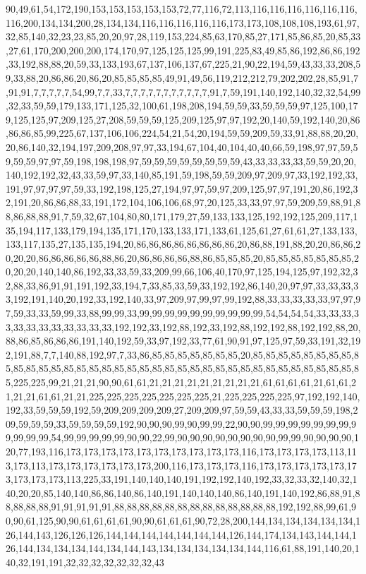 90,49,61,54,172,190,153,153,153,153,153,72,77,116,72,113,116,116,116,116,116,116,116,200,134,134,200,28,134,134,116,116,116,116,116,173,173,108,108,108,193,61,97,32,85,140,32,23,23,85,20,20,97,28,119,153,224,85,63,170,85,27,171,85,86,85,20,85,33,27,61,170,200,200,200,174,170,97,125,125,125,99,191,225,83,49,85,86,192,86,86,192,33,192,88,88,20,59,33,133,193,67,137,106,137,67,225,21,90,22,194,59,43,33,33,208,59,33,88,20,86,86,20,86,20,85,85,85,85,49,91,49,56,119,212,212,79,202,202,28,85,91,7,91,91,7,7,7,7,7,54,99,7,7,33,7,7,7,7,7,7,7,7,7,7,7,91,7,59,191,140,192,140,32,32,54,99,32,33,59,59,179,133,171,125,32,100,61,198,208,194,59,59,33,59,59,59,97,125,100,179,125,125,97,209,125,27,208,59,59,59,125,209,125,97,97,192,20,140,59,192,140,20,86,86,86,85,99,225,67,137,106,106,224,54,21,54,20,194,59,59,209,59,33,91,88,88,20,20,20,86,140,32,194,197,209,208,97,97,33,194,67,104,40,104,40,40,66,59,198,97,97,59,59,59,59,97,97,59,198,198,198,97,59,59,59,59,59,59,59,59,43,33,33,33,33,59,59,20,20,140,192,192,32,43,33,59,97,33,140,85,191,59,198,59,59,209,97,209,97,33,192,192,33,191,97,97,97,97,59,33,192,198,125,27,194,97,97,59,97,209,125,97,97,191,20,86,192,32,191,20,86,86,88,33,191,172,104,106,106,68,97,20,125,33,33,97,97,59,209,59,88,91,88,86,88,88,91,7,59,32,67,104,80,80,171,179,27,59,133,133,125,192,192,125,209,117,135,194,117,133,179,194,135,171,170,133,133,171,133,61,125,61,27,61,61,27,133,133,133,117,135,27,135,135,194,20,86,86,86,86,86,86,86,86,20,86,88,191,88,20,20,86,86,20,20,20,86,86,86,86,86,88,86,20,86,86,86,86,88,86,85,85,85,20,85,85,85,85,85,85,85,20,20,20,140,140,86,192,33,33,59,33,209,99,66,106,40,170,97,125,194,125,97,192,32,32,88,33,86,91,91,191,192,33,194,7,33,85,33,59,33,192,192,86,140,20,97,97,33,33,33,33,192,191,140,20,192,33,192,140,33,97,209,97,99,97,99,192,88,33,33,33,33,33,97,97,97,59,33,33,59,99,33,88,99,99,33,99,99,99,99,99,99,99,99,99,99,54,54,54,54,33,33,33,33,33,33,33,33,33,33,33,33,192,192,33,192,88,192,33,192,88,192,192,88,192,192,88,20,88,86,85,86,86,86,191,140,192,59,33,97,192,33,77,61,90,91,97,125,97,59,33,191,32,192,191,88,7,7,140,88,192,97,7,33,86,85,85,85,85,85,85,85,20,85,85,85,85,85,85,85,85,85,85,85,85,85,85,85,85,85,85,85,85,85,85,85,85,85,85,85,85,85,85,85,85,85,85,85,85,85,225,225,99,21,21,21,90,90,61,61,21,21,21,21,21,21,21,21,21,61,61,61,61,21,61,61,21,21,21,61,61,21,21,225,225,225,225,225,225,225,21,225,225,225,225,97,192,192,140,192,33,59,59,59,192,59,209,209,209,209,27,209,209,97,59,59,43,33,33,59,59,59,198,209,59,59,59,33,59,59,59,59,192,90,90,90,99,90,99,99,22,90,90,99,99,99,99,99,99,99,99,99,99,99,54,99,99,99,99,99,90,90,22,99,90,90,90,90,90,90,90,90,99,99,90,90,90,90,120,77,193,116,173,173,173,173,173,173,173,173,173,173,116,173,173,173,173,113,113,173,113,173,173,173,173,173,173,200,116,173,173,173,116,173,173,173,173,173,173,173,173,173,113,225,33,191,140,140,140,191,192,192,140,192,33,32,33,32,140,32,140,20,20,85,140,140,86,86,140,86,140,191,140,140,140,86,140,191,140,192,86,88,91,88,88,88,88,91,91,91,91,91,88,88,88,88,88,88,88,88,88,88,88,88,88,192,192,88,99,61,90,90,61,125,90,90,61,61,61,61,90,90,61,61,61,90,72,28,200,144,134,134,134,134,134,126,144,143,126,126,126,144,144,144,144,144,144,144,126,144,174,134,143,144,144,126,144,134,134,134,144,134,144,143,134,134,134,134,134,144,116,61,88,191,140,20,140,32,191,191,32,32,32,32,32,32,32,43